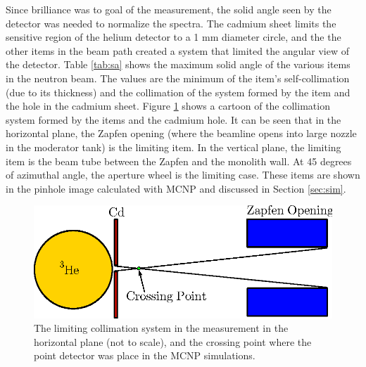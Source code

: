 \documentclass[5p,12pt]{elsarticle}
\begin{document}
Since brilliance was to goal of the measurement, the solid angle seen by the detector was needed to normalize the spectra.  The cadmium sheet limits the sensitive region of the helium detector to a 1 mm diameter circle, and the the other items in the beam path created a system that limited the angular view of the detector.  Table \ref{tab:sa} shows the maximum solid angle of the various items in the neutron beam.  The values are the minimum of the item's self-collimation (due to its thickness) and the collimation of the system formed by the item and the hole in the cadmium sheet.  Figure \ref{fig:solid_angle} shows a cartoon of the collimation system formed by the items and the cadmium hole.  It can be seen that in the horizontal plane, the Zapfen opening (where the beamline opens into large nozzle in the moderator tank) is the limiting item.  In the vertical plane, the limiting item is the beam tube between the Zapfen and the monolith wall.  At 45 degrees of azimuthal angle, the aperture wheel is the limiting case.  These items are shown in the pinhole image calculated with MCNP and discussed in Section \ref{sec:sim}.

\begin{figure}[h!] 
  \centering
    \includegraphics[width=\columnwidth]{graphics/solid_angle.eps}
     \caption{The limiting collimation system in the measurement in the horizontal plane (not to scale), and the crossing point where the point detector was place in the MCNP simulations. \label{fig:solid_angle}}
\end{figure}
\end{document}
